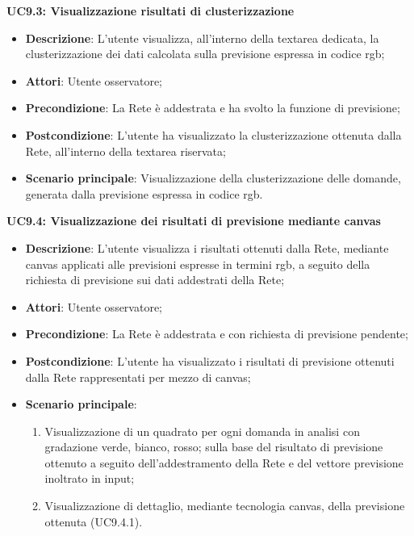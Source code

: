 \textbf{UC9.3: Visualizzazione risultati di clusterizzazione}\mbox{}
\label{UC9.3: Visualizzazione risultati di clusterizzazione}
\noindent
\begin{itemize}
\item \textbf{Descrizione}: L'utente visualizza, all'interno della textarea dedicata, la clusterizzazione dei dati calcolata sulla previsione espressa in codice rgb;
\item \textbf{Attori}: Utente osservatore;
\item \textbf{Precondizione}: La Rete \`e addestrata e ha svolto la funzione di previsione;
\item \textbf{Postcondizione}: L'utente ha visualizzato la clusterizzazione ottenuta dalla Rete, all'interno della textarea riservata;
\item \textbf{Scenario principale}: Visualizzazione della clusterizzazione delle domande, generata dalla previsione espressa in codice rgb.
\end{itemize}

\textbf{UC9.4: Visualizzazione dei risultati di previsione mediante canvas}\mbox{}
\label{UC9.4: Visualizzazione dei risultati di previsione mediante canvas}
\noindent
\begin{itemize}
\item \textbf{Descrizione}: L'utente visualizza i risultati ottenuti dalla Rete, mediante canvas applicati alle previsioni espresse in termini rgb, a seguito della richiesta di previsione sui dati addestrati della Rete;
\item \textbf{Attori}: Utente osservatore;
\item \textbf{Precondizione}: La Rete \`e addestrata e con richiesta di previsione pendente;
\item \textbf{Postcondizione}: L'utente ha visualizzato i risultati di previsione ottenuti dalla Rete rappresentati per mezzo di canvas; 
\item \textbf{Scenario principale}:
\begin{enumerate}
\item Visualizzazione di un quadrato per ogni domanda in analisi con gradazione verde, bianco, rosso; sulla base del risultato di previsione ottenuto a seguito dell'addestramento della Rete e del vettore previsione inoltrato in input;
\item Visualizzazione di dettaglio, mediante tecnologia canvas, della previsione ottenuta (UC9.4.1). 
\end{enumerate}
\end{itemize}

